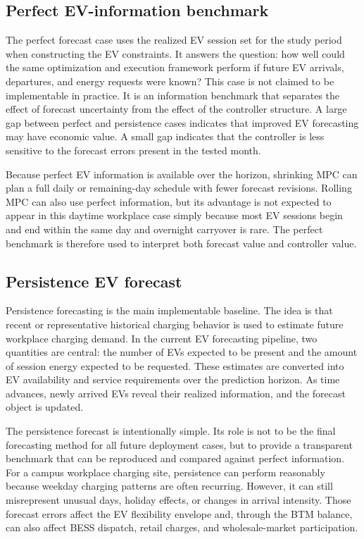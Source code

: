 \documentclass[final,5p,times]{elsarticle}
\begin{document}
\subsection{Perfect EV-information benchmark}
The perfect forecast case uses the realized EV session set for the study period when constructing the EV constraints. It answers the question: how well could the same optimization and execution framework perform if future EV arrivals, departures, and energy requests were known? This case is not claimed to be implementable in practice. It is an information benchmark that separates the effect of forecast uncertainty from the effect of the controller structure. A large gap between perfect and persistence cases indicates that improved EV forecasting may have economic value. A small gap indicates that the controller is less sensitive to the forecast errors present in the tested month.

Because perfect EV information is available over the horizon, shrinking MPC can plan a full daily or remaining-day schedule with fewer forecast revisions. Rolling MPC can also use perfect information, but its advantage is not expected to appear in this daytime workplace case simply because most EV sessions begin and end within the same day and overnight carryover is rare. The perfect benchmark is therefore used to interpret both forecast value and controller value.

\subsection{Persistence EV forecast}
Persistence forecasting is the main implementable baseline. The idea is that recent or representative historical charging behavior is used to estimate future workplace charging demand. In the current EV forecasting pipeline, two quantities are central: the number of EVs expected to be present and the amount of session energy expected to be requested. These estimates are converted into EV availability and service requirements over the prediction horizon. As time advances, newly arrived EVs reveal their realized information, and the forecast object is updated.

The persistence forecast is intentionally simple. Its role is not to be the final forecasting method for all future deployment cases, but to provide a transparent benchmark that can be reproduced and compared against perfect information. For a campus workplace charging site, persistence can perform reasonably because weekday charging patterns are often recurring. However, it can still misrepresent unusual days, holiday effects, or changes in arrival intensity. Those forecast errors affect the EV flexibility envelope and, through the BTM balance, can also affect BESS dispatch, retail charges, and wholesale-market participation.
\end{document}
